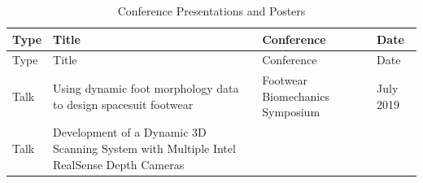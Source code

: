 \documentclass[defaultstyle,11pt]{comps}
\begin{document}
\hypertarget{tbl:conf}{}
\begin{longtable}[]{@{}llll@{}}
\caption{\label{tbl:conf}Conference Presentations and Posters}\tabularnewline
\toprule
\begin{minipage}[b]{0.22\columnwidth}\raggedright
Type\strut
\end{minipage} & \begin{minipage}[b]{0.22\columnwidth}\raggedright
Title\strut
\end{minipage} & \begin{minipage}[b]{0.22\columnwidth}\raggedright
Conference\strut
\end{minipage} & \begin{minipage}[b]{0.22\columnwidth}\raggedright
Date\strut
\end{minipage}\tabularnewline
\midrule
\endfirsthead
\toprule
\begin{minipage}[b]{0.22\columnwidth}\raggedright
Type\strut
\end{minipage} & \begin{minipage}[b]{0.22\columnwidth}\raggedright
Title\strut
\end{minipage} & \begin{minipage}[b]{0.22\columnwidth}\raggedright
Conference\strut
\end{minipage} & \begin{minipage}[b]{0.22\columnwidth}\raggedright
Date\strut
\end{minipage}\tabularnewline
\midrule
\endhead
\begin{minipage}[t]{0.22\columnwidth}\raggedright
Talk\strut
\end{minipage} & \begin{minipage}[t]{0.22\columnwidth}\raggedright
Using dynamic foot morphology data to design spacesuit footwear\strut
\end{minipage} & \begin{minipage}[t]{0.22\columnwidth}\raggedright
Footwear Biomechanics Symposium\strut
\end{minipage} & \begin{minipage}[t]{0.22\columnwidth}\raggedright
July 2019\strut
\end{minipage}\tabularnewline
\begin{minipage}[t]{0.22\columnwidth}\raggedright
Talk\strut
\end{minipage} & \begin{minipage}[t]{0.22\columnwidth}\raggedright
Development of a Dynamic 3D Scanning System with Multiple Intel RealSense Depth Cameras\strut

\end{minipage}
\end{longtable}
\end{document}
